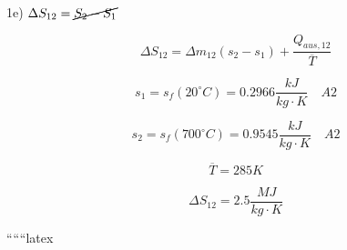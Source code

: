 1e) \(\Delta S_{12} = \cancel{\cancel{S_2 - S_1}}\)

\[
\Delta S_{12} = \Delta m_{12}(s_2 - s_1) + \frac{Q_{aus,12}}{\overline{T}}
\]

\[
s_1 = s_f(20^\circ C) = 0.2966 \frac{kJ}{kg \cdot K} \quad A2
\]

\[
s_2 = s_f(700^\circ C) = 0.9545 \frac{kJ}{kg \cdot K} \quad A2
\]

\[
\overline{T} = 285 K
\]

\[
\Delta S_{12} = 2.5 \frac{MJ}{kg \cdot K}
\]

``````latex